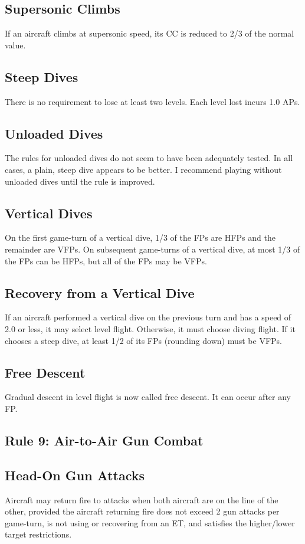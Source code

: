 \documentclass[10pt]{article}
\begin{document}
\subsection{Supersonic Climbs} If an aircraft climbs at supersonic speed, its CC is reduced to 2/3 of the normal value.

\subsection{Steep Dives} There is no requirement to lose at least two levels. Each level lost incurs 1.0 APs.

\subsection{Unloaded Dives} The rules for unloaded dives do not seem to have been adequately tested. In all cases, a plain, steep dive appears to be better. I recommend playing without unloaded dives until the rule is improved.

\subsection{Vertical Dives} On the first game-turn of a vertical dive, 1/3 of the FPs are HFPs and the remainder are VFPs. On subsequent game-turns of a vertical dive, at most 1/3 of the FPs can be HFPs, but all of the FPs may be VFPs.

\subsection{Recovery from a Vertical Dive} If an aircraft performed a vertical dive on the previous turn and has a speed of 2.0 or less, it may select level flight. Otherwise, it must choose diving flight. If it chooses a steep dive, at least 1/2 of its FPs (rounding down) must be VFPs.

\subsection{Free Descent} Gradual descent in level flight is now called free descent. It can occur after any FP.

\subsection{Rule 9: Air-to-Air Gun Combat}

\subsection{Head-On Gun Attacks} Aircraft may return fire to attacks when both aircraft are on the  line of the other, provided the aircraft returning fire does not exceed 2 gun attacks per game-turn, is not using or recovering from an ET, and satisfies the higher/lower target restrictions.
\end{document}
